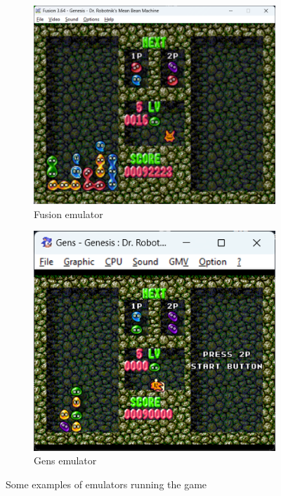 \documentclass{report}
\begin{document}
\begin{figure}[ht]
\centering
\begin{subfigure}{0.49\textwidth}
\centering
\includegraphics[width = \textwidth]{emulator1.png}
\caption{Fusion emulator}
\label{fig:emu1}
\end{subfigure}
\begin{subfigure}{0.45\textwidth}
\centering
\includegraphics[width = \textwidth]{emulator2.png}
\caption{Gens emulator}
\label{fig:emu2}
\end{subfigure}
\caption{Some examples of emulators running the game}
\label{fig:combined}
\end{figure}
\end{document}
